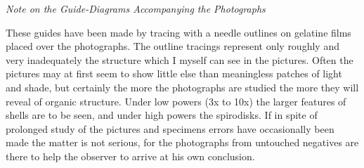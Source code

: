 \documentclass[a4paper, 12pt, oneside, landscape]{article}
\begin{document}
\bigskip
\centerline{\emph{Note on the Guide-Diagrams Accompanying the Photographs}}

These guides have been made by tracing with a needle outlines on gelatine films placed over the photographs. The outline tracings represent only roughly and very inadequately the structure which I myself can see in the pictures. Often the pictures may at first seem to show little else than meaningless patches of light and shade, but certainly the more the photographs are studied the more they will reveal of organic structure. Under low powers (3x to 10x) the larger features of shells are to be seen, and under high powers the spirodisks. If in spite of prolonged study of the pictures and specimens errors have occasionally been made the matter is not serious, for the photographs from untouched negatives are there to help the observer to arrive at his own conclusion.
\end{document}
